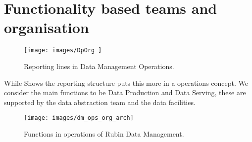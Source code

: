 \section{Functionality based teams and organisation} \label{sec:org}

\begin{figure}
\begin{centering}
\texttt{[image: images/DpOrg ]}
	\caption{Reporting lines in Data Management Operations.
\label{fig:org}}
\end{centering}
\end{figure}


While  Shows the reporting structure  puts this more in a operations concept. We consider the main functions to be Data Production and Data Serving, these are supported by the data abstraction team and the data facilities.

\begin{figure}
\begin{centering}
\texttt{[image: images/dm\_ops\_org\_arch]}
\caption{Functions in operations of Rubin Data Management.\label{fig:arcorg}}
\end{centering}
\end{figure}
